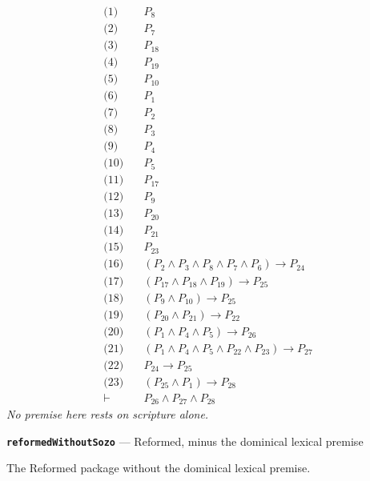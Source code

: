 \documentclass[11pt]{article}
\begin{document}
\begin{align*}
  \text{(1)} \quad & P_{8} \\
  \text{(2)} \quad & P_{7} \\
  \text{(3)} \quad & P_{18} \\
  \text{(4)} \quad & P_{19} \\
  \text{(5)} \quad & P_{10} \\
  \text{(6)} \quad & P_{1} \\
  \text{(7)} \quad & P_{2} \\
  \text{(8)} \quad & P_{3} \\
  \text{(9)} \quad & P_{4} \\
  \text{(10)} \quad & P_{5} \\
  \text{(11)} \quad & P_{17} \\
  \text{(12)} \quad & P_{9} \\
  \text{(13)} \quad & P_{20} \\
  \text{(14)} \quad & P_{21} \\
  \text{(15)} \quad & P_{23} \\
  \text{(16)} \quad & (P_{2} \land P_{3} \land P_{8} \land P_{7} \land P_{6}) \rightarrow P_{24} \\
  \text{(17)} \quad & (P_{17} \land P_{18} \land P_{19}) \rightarrow P_{25} \\
  \text{(18)} \quad & (P_{9} \land P_{10}) \rightarrow P_{25} \\
  \text{(19)} \quad & (P_{20} \land P_{21}) \rightarrow P_{22} \\
  \text{(20)} \quad & (P_{1} \land P_{4} \land P_{5}) \rightarrow P_{26} \\
  \text{(21)} \quad & (P_{1} \land P_{4} \land P_{5} \land P_{22} \land P_{23}) \rightarrow P_{27} \\
  \text{(22)} \quad & P_{24} \rightarrow P_{25} \\
  \text{(23)} \quad & (P_{25} \land P_{1}) \rightarrow P_{28} \\
  \vdash \quad & P_{26} \land P_{27} \land P_{28}
\end{align*}
\emph{No premise here rests on scripture alone.}
\par\medskip\noindent\textbf{\texttt{reformed\allowbreak{}Without\allowbreak{}Sozo}} --- Reformed, minus the dominical lexical premise\par\nobreak\noindent
The Reformed package without the dominical lexical premise.
\end{document}
